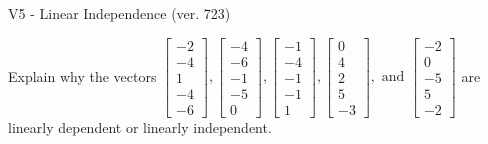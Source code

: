 \begin{exercise}
  \begin{exerciseTitle}V5 - Linear Independence (ver. 723)\end{exerciseTitle}
  \begin{exerciseStatement}
    Explain why the vectors \(\left[\begin{array}{r}
-2 \\
-4 \\
1 \\
-4 \\
-6
\end{array}\right] , \left[\begin{array}{r}
-4 \\
-6 \\
-1 \\
-5 \\
0
\end{array}\right] , \left[\begin{array}{r}
-1 \\
-4 \\
-1 \\
-1 \\
1
\end{array}\right] , \left[\begin{array}{r}
0 \\
4 \\
2 \\
5 \\
-3
\end{array}\right] , \text{ and } \left[\begin{array}{r}
-2 \\
0 \\
-5 \\
5 \\
-2
\end{array}\right]\) are linearly dependent or linearly independent.	



\end{exerciseStatement}
\end{exercise}

